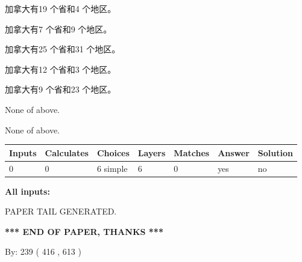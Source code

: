\documentclass{ctexart}
\begin{document}
 
加拿大有19 个省和4 个地区。
 
 
加拿大有7 个省和9 个地区。
 
 
加拿大有25 个省和31 个地区。
 
 
加拿大有12 个省和3 个地区。
 
 
加拿大有9 个省和23 个地区。
 
 
 None of above.
 
 
\noindent{}
 
 
 None of above.
 
 
\noindent{}
 
 
   
   
   
   
\noindent\begin{tabular}{|l|l|l|l|l|l|l|}
 \hline
Inputs & Calculates & Choices & Layers & Matches & Answer & Solution \\ \hline
 0  & 
 0  & 
 6
  simple  
  & 
 6  & 
 0  & 
  yes & 
  no 
  \\ \hline
 \end{tabular}
   
   
   
   
\noindent{}
   
   
   
   
\noindent\vspace{0.1in}\hspace{-0.08in} {\textbf{\Large{All inputs: }}}
   
   
   
   
   
   
 \vspace{0.2in}
 
   
   
\vspace{2.0in} PAPER TAIL GENERATED.
   
   
   
   
\vspace{1.0in} 
{\textbf{\large{ *** END OF PAPER, THANKS *** }}} 
   
   
\hspace{1.0in} By: 
 239 ( 416 ,  613 )
   
\end{document}
